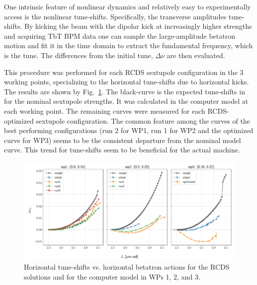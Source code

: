 One intrinsic feature of nonlinear dynamics and relatively easy to experimentally access is the nonlinear tune-shifts. Specifically, the transverse amplitudes tune-shifts. By kicking the beam with the dipolar kick at increasingly higher strengths and acquiring TbT BPM data one can sample the large-amplitude betatron motion and fit it in the time domain to extract the fundamental frequency, which is the tune. The differences from the initial tune, $\Delta\nu$ are then evaluated.

This procedure was performed for each RCDS sextupole configuration in the 3 working points, specializing to the horizontal tune-shifts due to horizontal kicks. The results are shown by Fig.~\ref{fig:adts}. The black-curve is the expected tune-shifts in for the nominal sextupole strengths. It was calculated in the computer model at each working point. The remaining curves were measured for each RCDS-optimized sextupole configuration. The common feature among the curves of the best performing configurations (run 2 for WP1, run 1 for WP2 and the optimized curve for WP3) seems to be the consistent departure from the nominal model curve. This trend for tune-shifts seem to be beneficial for the actual machine.
\begin{figure}
    \includegraphics[width=\columnwidth]{Images/opt_configs_dtunes.pdf}
    \caption[Horizontal tune-shifts vs. horizontal betatron actions for the RCDS solutions and for the computer model in WPs 1, 2, and 3.]{Horizontal tune-shifts vs. horizontal betatron actions for the RCDS solutions and for the computer model in WPs 1, 2, and 3.}
    \label{fig:adts}
\end{figure}
